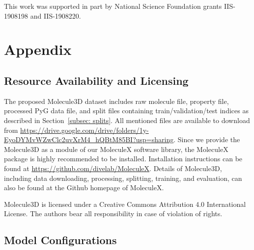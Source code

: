 \documentclass{article}
\begin{document}
\begin{ack}
This work was supported in part by National Science Foundation grants IIS-1908198 and IIS-1908220.

\end{ack}


































\newpage
\appendix

\section{Appendix}

\subsection{Resource Availability and Licensing}

The proposed Molecule3D dataset includes raw molecule file, property file, processed PyG data file, and split files containing train/validation/test indices as described in Section~\ref{subsec: splits}. All mentioned files are available to download from \url{https://drive.google.com/drive/folders/1y-EyoDYMvWZwClc2uvXrM4\_hQBtM85BI?usp=sharing}. Since we provide the Molecule3D as a module of our MoleculeX software library, the MoleculeX package is highly recommended to be installed. Installation instructions can be found at \url{https://github.com/divelab/MoleculeX}. Details of Molecule3D, including data downloading, processing, splitting, training, and evaluation, can also be found at the Github homepage of MoleculeX. 

Molecule3D is licensed under a Creative Commons Attribution 4.0 International License. The authors bear all responsibility in case of violation of rights.


\subsection{Model Configurations}
\end{document}
